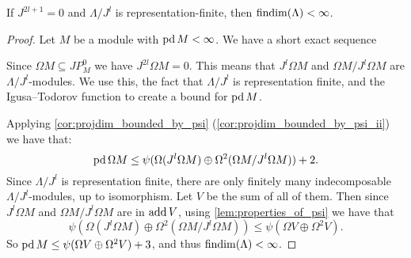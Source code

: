 \begin{theorem}\cite{Wang94}\label{thm:half_rep_finite}
	If $J^{2l+1} = 0$ and $\Lambda / J^l$ is representation-finite, then $\operatorname{findim}(\Lambda) < \infty$.
	\begin{proof}
		Let $M$ be a module with $\operatorname{pd} M < \infty$. We have a short exact sequence 
		\begin{center}
		\end{center}
		Since $\Omega M \subseteq JP^0_M$ we have $J^{2l}\Omega M = 0$. This means that $J^l\Omega M$ and $\Omega M / J^l\Omega M$ are $\Lambda / J^l$-modules. We use this, the fact that $\Lambda / J^l$ is representation finite, and the Igusa--Todorov function to create a bound for $\operatorname{pd} M$.
		
		Applying \cref{cor:projdim_bounded_by_psi} (\ref{cor:projdim_bounded_by_psi_ii}) we have that:
		$$ \operatorname{pd} \Omega M \leq \psi(\Omega (J^l\Omega M)\oplus\Omega^2(\Omega M / J^l\Omega M)) + 2.$$ 
		Since $\Lambda / J^l$ is representation finite, there are only finitely many indecomposable $\Lambda / J^l$-modules, up to isomorphism. Let $V$ be the sum of all of them. Then since $J^l\Omega M$ and $\Omega M / J^l\Omega M$ are in $\operatorname{add} V$, using \cref{lem:properties_of_psi} we have that 
		$$\psi(\Omega (J^l\Omega M)\oplus\Omega^2(\Omega M / J^l\Omega M)) \leq \psi(\Omega V \oplus \Omega^2 V).$$
		So $\operatorname{pd} M \leq \psi(\Omega V \oplus \Omega^2 V) + 3$, and thus $\operatorname{findim}(\Lambda) < \infty$.
	\end{proof}
\end{theorem}
